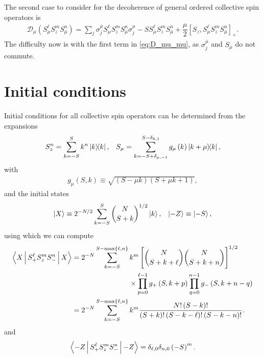 \documentclass[aps,notitlepage,nofootinbib,11pt]{revtex4-1}
\newcommand{\f}[2]{\dfrac{#1}{#2}} %
\newcommand{\p}[1]{\left(#1\right)} %
\renewcommand{\sp}[1]{\left[#1\right]} %
\renewcommand{\set}[1]{\left\{#1\right\}} %
\newcommand{\bk}{\Braket} %
\newcommand{\D}{\mathcal{D}}
\newcommand{\bmu}{{\bar\mu}}
\newcommand{\1}{\mathds{1}}
\begin{document}
The second case to consider for the decoherence of general ordered
collective spin operators is
\begin{align}
  \D_\mu\p{S_\mu^\ell S_z^m S_\bmu^n}
  = \sum_j\sigma_j^\bmu S_\mu^\ell S_z^m S_\bmu^n \sigma_j^\mu
  - S S_\mu^\ell S_z^m S_\bmu^n
  + \f{\mu}{2} \sp{S_z, S_\mu^\ell S_z^m S_\bmu^n}_+.
  \label{eq:D_mu_mu}
\end{align}
The difficulty now is with the first term in \eqref{eq:D_mu_mu}, as
$\sigma_j^\bmu$ and $S_\mu$ do not commute.


\section{Initial conditions}
\label{sec:initial_conditions}

Initial conditions for all collective spin operators can be determined
from the expansions
\begin{align}
  S_z^n = \sum_{k=-S}^S k^n \op{k},
  &&
  S_\mu
  = \sum_{k=-S+\delta_{\mu,-1}}^{S-\delta_{k,1}}
  g_\mu\p{k} \op{k+\mu}{k},
\end{align}
with
\begin{align}
  g_\mu\p{S,k} \equiv \sqrt{\p{S-\mu k}\p{S+\mu k+1}},
\end{align}
and the initial states
\begin{align}
  \ket{X} \equiv 2^{-N/2} \sum_{k=-S}^S { N \choose S+k }^{1/2} \ket{k},
  &&
  \ket{-Z} \equiv \ket{-S},
\end{align}
using which we can compute
\begin{align}
  \bk{X|S_+^\ell S_z^m S_-^n|X}
  &=  2^{-N} \sum_{k=-S}^{S-\max\set{\ell,n}} k^m
  \sp{{ N \choose S+k+\ell } { N \choose S+k+n }}^{1/2} \tag*{} \\
  &\qquad\qquad\qquad\qquad
  \times \prod_{p=0}^{\ell-1} g_+\p{S,k+p}
  \prod_{q=0}^{n-1} g_-\p{S,k+n-q} \\
  &= 2^{-N} \sum_{k=-S}^{S-\max\set{\ell,n}} k^m
  \f{N!\p{S-k}!}{\p{S+k}!\p{S-k-\ell}!\p{S-k-n}!}.
\end{align}
and
\begin{align}
  \bk{-Z|S_+^\ell S_z^m S_-^n|-Z}
  = \delta_{\ell,0} \delta_{n,0} \p{-S}^m.
\end{align}
\end{document}

